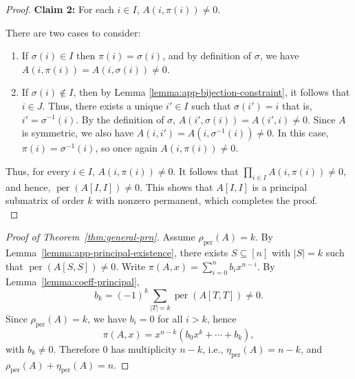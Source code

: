 \documentclass[11pt]{article}
\DeclareMathOperator{\per}{per}
\theoremstyle{plain}
\theoremstyle{definition}
\theoremstyle{remark}
\begin{document}
\begin{proof}
\textbf{Claim 2:} For each \( i \in I \), \( A(i,\pi(i)) \neq 0 .\)  

There are two cases to consider:
\begin{enumerate}
    \item If \( \sigma(i) \in I \) then \( \pi(i) = \sigma(i) \), and by definition of \( \sigma \), we have
    \(
    A(i, \pi(i)) = A(i, \sigma(i)) \neq 0.
    \)
    
    \item If \( \sigma(i) \notin I \), then by Lemma \ref{lemma:app-bijection-constraint}, it follows that \( i \in J \). Thus, there exists a unique \( i' \in I \) such that \( \sigma(i') = i \) that is, \( i' = \sigma^{-1}(i) \). By the definition of \( \sigma \),
    \(
    A(i', \sigma(i)) = A(i', i) \neq 0.
    \)
    Since \( A \) is symmetric, we also have \( A(i, i') = A(i, \sigma^{-1}(i)) \neq 0 \). In this case, \( \pi(i) = \sigma^{-1}(i) \), so once again \( A(i, \pi(i)) \neq 0 \).
\end{enumerate}


Thus, for every \( i \in I \), \( A(i,\pi(i))\neq 0 \). It follows that
\(
\prod_{i \in I} A(i,\pi(i)) \neq 0,
\)
and hence,
\(
\per(A[I, I]) \neq 0.
\)
This shows that \( A[I,I] \) is a principal submatrix of order \( k \) with nonzero permanent, which completes the proof. \\
\end{proof}

\begin{proof}[Proof of Theorem~\ref{thm:general-prn}]
Assume \(\rho_{\per}(A)=k\). By Lemma~\ref{lemma:app-principal-existence}, there exists
\(S\subseteq[n]\) with \(|S|=k\) such that \(\per(A[S,S])\neq 0\).
Write \(\pi(A,x)=\sum_{i=0}^n b_i x^{n-i}\).
By Lemma~\ref{lemma:coeff-principal},
\[
b_k = (-1)^k\sum_{|T|=k}\per(A[T,T])\neq 0.
\]
Since \(\rho_{\per}(A)=k\), we have \(b_i=0\) for all \(i>k\), hence
\[
\pi(A,x)=x^{n-k}(b_0x^k+\cdots+b_k),
\]
with \(b_k\neq 0\). Therefore \(0\) has multiplicity \(n-k\), i.e.,
\(\eta_{\per}(A)=n-k\), and \(\rho_{\per}(A)+\eta_{\per}(A)=n\).
\end{proof}





\end{document}
